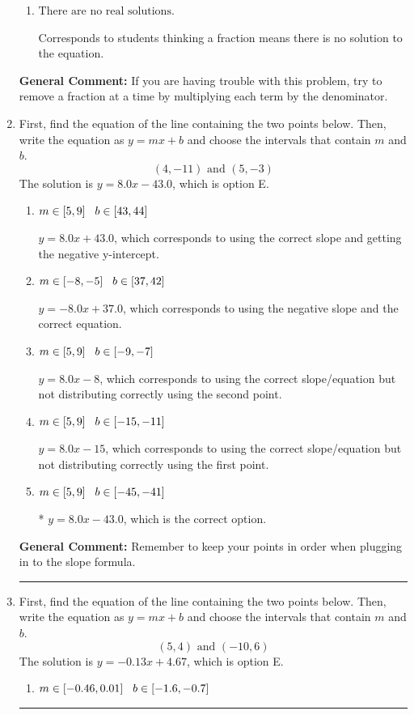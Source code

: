 \documentclass{extbook}[14pt]
\newcommand{\litem}[1]{\item #1

\rule{\textwidth}{0.4pt}}
\begin{document}
\begin{enumerate}
{\begin{enumerate}[label=\Alph*.]
* $x = -2.175$, which is the correct option.
\item \( \text{There are no real solutions.} \)

Corresponds to students thinking a fraction means there is no solution to the equation.
\end{enumerate}

\textbf{General Comment:} If you are having trouble with this problem, try to remove a fraction at a time by multiplying each term by the denominator.
}
\litem{
First, find the equation of the line containing the two points below. Then, write the equation as $ y=mx+b $ and choose the intervals that contain $m$ and $b$.
\[ (4, -11) \text{ and } (5, -3) \]
The solution is \( y = 8.0x -43.0 \), which is option E.\begin{enumerate}[label=\Alph*.]
\item \( m \in [5, 9] \hspace*{3mm} b \in [43, 44] \)

 $y = 8.0x + 43.0$, which corresponds to using the correct slope and getting the negative y-intercept.
\item \( m \in [-8, -5] \hspace*{3mm} b \in [37, 42] \)

 $y = -8.0x + 37.0$, which corresponds to using the negative slope and the correct equation.
\item \( m \in [5, 9] \hspace*{3mm} b \in [-9, -7] \)

 $y = 8.0x -8$, which corresponds to using the correct slope/equation but not distributing correctly using the second point.
\item \( m \in [5, 9] \hspace*{3mm} b \in [-15, -11] \)

 $y = 8.0x -15$, which corresponds to using the correct slope/equation but not distributing correctly using the first point.
\item \( m \in [5, 9] \hspace*{3mm} b \in [-45, -41] \)

* $y = 8.0x -43.0$, which is the correct option.
\end{enumerate}

\textbf{General Comment:} Remember to keep your points in order when plugging in to the slope formula.
}
\litem{
First, find the equation of the line containing the two points below. Then, write the equation as $ y=mx+b $ and choose the intervals that contain $m$ and $b$.
\[ (5, 4) \text{ and } (-10, 6) \]
The solution is \( y = -0.13x + 4.67 \), which is option E.\begin{enumerate}[label=\Alph*.]
\item \( m \in [-0.46, 0.01] \hspace*{3mm} b \in [-1.6, -0.7] \)


\end{enumerate}}
\end{enumerate}
\end{document}
